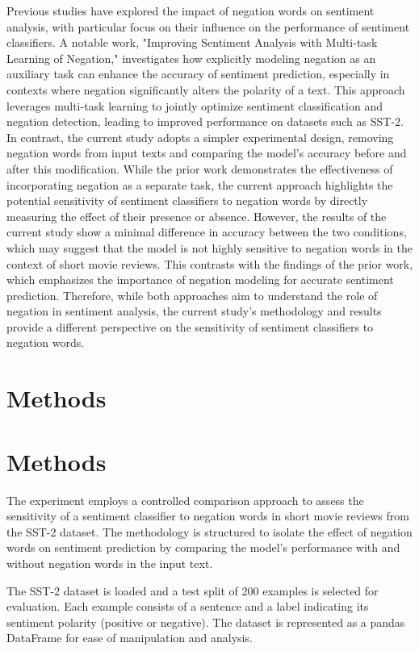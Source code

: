 \documentclass{article}
\begin{document}
Previous studies have explored the impact of negation words on sentiment analysis, with particular focus on their influence on the performance of sentiment classifiers. A notable work, "Improving Sentiment Analysis with Multi-task Learning of Negation," investigates how explicitly modeling negation as an auxiliary task can enhance the accuracy of sentiment prediction, especially in contexts where negation significantly alters the polarity of a text. This approach leverages multi-task learning to jointly optimize sentiment classification and negation detection, leading to improved performance on datasets such as SST-2. In contrast, the current study adopts a simpler experimental design, removing negation words from input texts and comparing the model's accuracy before and after this modification. While the prior work demonstrates the effectiveness of incorporating negation as a separate task, the current approach highlights the potential sensitivity of sentiment classifiers to negation words by directly measuring the effect of their presence or absence. However, the results of the current study show a minimal difference in accuracy between the two conditions, which may suggest that the model is not highly sensitive to negation words in the context of short movie reviews. This contrasts with the findings of the prior work, which emphasizes the importance of negation modeling for accurate sentiment prediction. Therefore, while both approaches aim to understand the role of negation in sentiment analysis, the current study's methodology and results provide a different perspective on the sensitivity of sentiment classifiers to negation words.
\section{Methods}
\section{Methods}

The experiment employs a controlled comparison approach to assess the sensitivity of a sentiment classifier to negation words in short movie reviews from the SST-2 dataset. The methodology is structured to isolate the effect of negation words on sentiment prediction by comparing the model's performance with and without negation words in the input text.

The SST-2 dataset is loaded and a test split of 200 examples is selected for evaluation. Each example consists of a sentence and a label indicating its sentiment polarity (positive or negative). The dataset is represented as a pandas DataFrame for ease of manipulation and analysis.
\end{document}
